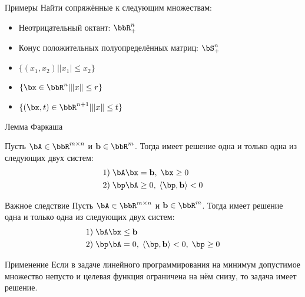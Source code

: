 \documentclass[12pt]{beamer}
\begin{document}
\begin{frame}{Примеры}
Найти сопряжённые к следующим множествам:
\begin{itemize}
\item Неотрицательный октант: $\bbR^n_+$
\item Конус положительных полуопределённых матриц: $\bS^n_+$
\item $\{ (x_1, x_2) | |x_1| \leq x_2 \}$
\item $\{ \bx \in \bbR^n | \| x \| \leq r \}$
\item $\{ (\bx, t) \in \bbR^{n+1} | \| x \| \leq t \}$
\end{itemize}
\end{frame}

\begin{frame}{Лемма Фаркаша}
\scriptsize
\begin{lemma}[Фаркаш]
Пусть $\bA \in \bbR^{m \times n}$ и $\mathbf{b} \in \bbR^m$. Тогда имеет решение одна и только одна из следующих двух систем:
\vspace{-4mm}
\begin{equation*}
\begin{split}
1)& \; \bA\bx = \mathbf{b}, \; \bx \geq 0\\
2)& \; \bp\bA \geq 0, \; \langle \bp, \mathbf{b} \rangle < 0
\end{split}
\end{equation*}
\end{lemma}

\begin{block}{Важное следствие}
Пусть $\bA \in \bbR^{m \times n}$ и $\mathbf{b} \in \bbR^m$. Тогда имеет решение одна и только одна из следующих двух систем:
\vspace{-4mm}
\begin{equation*}
\begin{split}
1)& \; \bA\bx \leq \mathbf{b}\\
2)& \; \bp\bA = 0, \; \langle \bp, \mathbf{b} \rangle < 0, \; \bp \geq 0
\end{split}
\end{equation*}
\end{block}

\begin{block}{Применение}
Если в задаче линейного программирования на минимум допустимое множество непусто и целевая функция ограничена на нём снизу, то задача имеет решение.
\end{block}

\end{frame}
\end{document}
